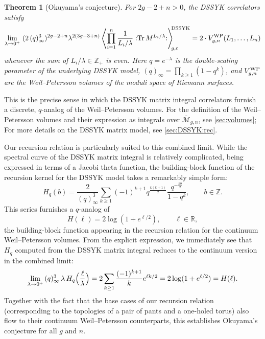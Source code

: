 \documentclass[a4paper,11pt,english]{article}
\theoremstyle{plain}
\theoremstyle{definition}
\theoremstyle{plain}
\newtheorem{introthm}{Theorem}
\newcommand{\cc}{\mathrm{c}}
\DeclareMathOperator{\Tr}{Tr}
\newcommand{\normord}[1]{:\mathrel{#1}:}
\newcommand{\NTr}[1]{\normord{\Tr{#1}}}
\newcommand{\Z}{\mathbb{Z}}
\newcommand{\R}{\mathbb{R}}
\newcommand{\Mbar}{\overline{\mathcal{M}}}
\begin{document}
\begin{introthm}[Okuyama's conjecture]\label{thm:C}
    For $2g-2+n > 0$, the DSSYK correlators satisfy
    \begin{equation} \label{eq:OkConj}
        \lim_{\lambda \rightarrow 0^+} \
        (2 \, (q)_{\infty}^3)^{2g-2+n}
        \lambda^{2(3g-3+n)} 
        \left\langle 
            \prod_{i=1}^n 
            \frac{1}{L_i/\lambda} 
            \NTr{M^{L_i/\lambda}} 
        \right\rangle_{\!\!g,\cc}^{\!\!\textup{DSSYK}}
        =
        2 \cdot V^{\textup{WP}}_{g,n}(L_1,\ldots,L_n)
    \end{equation}
    whenever the sum of $L_i/\lambda \in \mathbb{Z}_+$ is even. Here $q = e^{-\lambda}$ is the double-scaling parameter of the underlying DSSYK model, $(q)_{\infty} = \prod_{k \ge 1} (1-q^k)$, and $V^{\textup{WP}}_{g,n}$ are the Weil--Petersson volumes of the moduli space of Riemann surfaces.
\end{introthm}

This is the precise sense in which the DSSYK matrix integral correlators furnish a discrete, $q$-analog of the Weil--Petersson volumes. 
For the definition of the Weil--Petersson volumes and their expression as integrals over $\Mbar_{g,n}$, see \cref{sec:volumes}; For more details on the DSSYK matrix model, see \cref{sec:DSSYK:rec}.

Our recursion relation is particularly suited to this combined limit. While the spectral curve of the DSSYK matrix integral is relatively complicated, being expressed in terms of a Jacobi theta function, the building-block function of the recursion kernel for the DSSYK model takes a remarkably simple form:
\begin{equation}
	H_q(b)
	=
	\frac{2}{(q)_{\infty}^3} \sum_{k \ge 1}
		(-1)^{k+1} q^{\frac{k(k+1)}{2}}
		\frac{q^{-\frac{kb}{2}}}{1 - q^k},
    \qquad
    b \in \Z.
\end{equation}
This series furnishes a $q$-analog of 
\begin{equation}
    H(\ell) = 2 \log(1 + e^{\ell/2}),
    \qquad
    \ell \in \R,
\end{equation}
the building-block function appearing in the recursion relation for the continuum Weil--Petersson volumes. From the explicit expression, we immediately see that $H_q$ computed from the DSSYK matrix integral reduces to the continuum version in the combined limit:
\begin{equation}
	\lim_{\lambda \to 0^+} \,
	   (q)_{\infty}^3 \, \lambda \,
       H_q\Bigl( \frac{\ell}{\lambda} \Bigr)
	=
	2 \sum_{k \ge 1} \frac{(-1)^{k+1}}{k} e^{\ell k/2}
	=
	2 \log(1 + e^{\ell/2}) 
	= H(\ell) .
\end{equation}
Together with the fact that the base cases of our recursion relation (corresponding to the topologies of a pair of pants and a one-holed torus) also flow to their continuum Weil--Petersson counterparts, this establishes Okuyama's conjecture for all $g$ and $n$.
\end{document}
